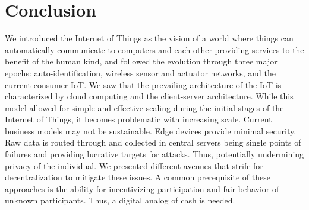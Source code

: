 
\section{Conclusion}

We introduced the Internet of Things as the vision of a world where things can automatically communicate to computers and each other providing services to the benefit of the human kind, and followed the evolution through three major epochs: auto-identification, wireless sensor and actuator networks, and the current consumer IoT. We saw that the prevailing architecture of the IoT is characterized by cloud computing and the client-server architecture. While this model allowed for simple and effective scaling during the initial stages of the Internet of Things, it becomes problematic with increasing scale. Current business models may not be sustainable. Edge devices provide minimal security. Raw data is routed through and collected in central servers being single points of failures and providing lucrative targets for attacks. Thus, potentially undermining privacy of the individual. We presented different avenues that strife for decentralization to mitigate these issues. A common prerequisite of these approaches is the ability for incentivizing participation and fair behavior of unknown participants. Thus, a digital analog of cash is needed. 



